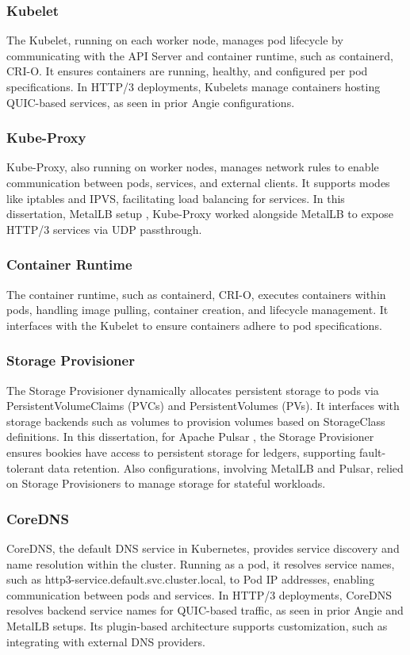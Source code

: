 \subsubsection{Kubelet}
The Kubelet, running on each worker node, manages pod lifecycle by communicating with the API Server and container runtime, such as containerd, CRI-O. It ensures containers are running, healthy, and configured per pod specifications. In HTTP/3 deployments, Kubelets manage containers hosting QUIC-based services, as seen in prior Angie configurations.

\subsubsection{Kube-Proxy}
Kube-Proxy, also running on worker nodes, manages network rules to enable communication between pods, services, and external clients. It supports modes like iptables and IPVS, facilitating load balancing for services. In this dissertation, MetalLB setup \cite{metallb-docs}, Kube-Proxy worked alongside MetalLB to expose HTTP/3 services via UDP passthrough.

\subsubsection{Container Runtime}
The container runtime, such as containerd, CRI-O, executes containers within pods, handling image pulling, container creation, and lifecycle management. It interfaces with the Kubelet to ensure containers adhere to pod specifications.

\subsubsection{Storage Provisioner}
The Storage Provisioner dynamically allocates persistent storage to pods via PersistentVolumeClaims (PVCs) and PersistentVolumes (PVs). It interfaces with storage backends such as volumes to provision volumes based on StorageClass definitions. In this dissertation, for Apache Pulsar \cite{pulsar-helm-repo}, the Storage Provisioner ensures bookies have access to persistent storage for ledgers, supporting fault-tolerant data retention. Also configurations, involving MetalLB and Pulsar, relied on Storage Provisioners to manage storage for stateful workloads.

\subsubsection{CoreDNS}
CoreDNS, the default DNS service in Kubernetes, provides service discovery and name resolution within the cluster. Running as a pod, it resolves service names, such as http3-service.default.svc.cluster.local, to Pod IP addresses, enabling communication between pods and services. In HTTP/3 deployments, CoreDNS resolves backend service names for QUIC-based traffic, as seen in prior Angie and MetalLB setups. Its plugin-based architecture supports customization, such as integrating with external DNS providers.

